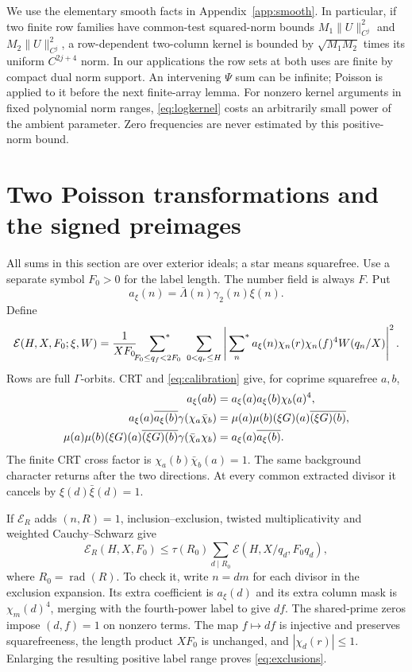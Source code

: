 \documentclass[11pt,a4paper]{article}
\numberwithin{equation}{section}
\theoremstyle{definition}
\theoremstyle{remark}
\newcommand{\rad}{\operatorname{rad}}
\newcommand{\sfstar}{\sideset{}{^*}\sum}
\newcommand{\E}{\mathcal E}
\begin{document}
We use the elementary smooth facts in Appendix~\ref{app:smooth}. In particular, if two finite row families have common-test squared-norm bounds $M_1\|U\|_{C^j}^2$ and $M_2\|U\|_{C^j}^2$, a row-dependent two-column kernel is bounded by $\sqrt{M_1M_2}$ times its uniform $C^{2j+4}$ norm. In our applications the row sets at both uses are finite by compact dual norm support. An intervening $\Psi$ sum can be infinite; Poisson is applied to it before the next finite-array lemma. For nonzero kernel arguments in fixed polynomial norm ranges, \eqref{eq:logkernel} costs an arbitrarily small power of the ambient parameter. Zero frequencies are never estimated by this positive-norm bound.

\section{Two Poisson transformations and the signed preimages}\label{sec:transfer}
All sums in this section are over exterior ideals; a star means squarefree. Use a separate symbol $F_0>0$ for the label length. The number field is always $F$. Put
\[
 a_\xi(n)=\bar\Lambda(n)\gamma_2(n)\xi(n).
 \]
 Define
 \[
 \E(H,X,F_0;\xi,W)=\frac1{XF_0}
  \sfstar_{F_0\le q_f<2F_0}\ \sum_{0<q_r\le H}
 \left|\sfstar_n a_\xi(n)\chi_n(r)\chi_n(f)^4W(q_n/X)\right|^2.
\]
Rows are full $\Gamma$-orbits. CRT and \eqref{eq:calibration} give, for coprime squarefree $a,b$,
\begin{align}\label{eq:pairGauss}
 a_\xi(ab)&=a_\xi(a)a_\xi(b)\chi_b(a)^4,\notag\\
 a_\xi(a)\overline{a_\xi(b)}\gamma(\chi_a\bar\chi_b)
   &=\mu(a)\mu(b)(\xi G)(a)\overline{(\xi G)(b)},\\
 \mu(a)\mu(b)(\xi G)(a)\overline{(\xi G)(b)}
             \gamma(\bar\chi_a\chi_b)
   &=a_\xi(a)\overline{a_\xi(b)}.\notag
\end{align}
The finite CRT cross factor is $\chi_a(b)\bar\chi_b(a)=1$. The same background character returns after the two directions. At every common extracted divisor it cancels by $\xi(d)\bar\xi(d)=1$.

If $\E_R$ adds $(n,R)=1$, inclusion--exclusion, twisted multiplicativity and weighted Cauchy--Schwarz give
\begin{equation}\label{eq:exclusions}
 \E_R(H,X,F_0)\le\tau(R_0)\sum_{d\mid R_0}
                     \E(H,X/q_d,F_0q_d),
\end{equation}
where $R_0=\rad(R)$. To check it, write $n=dm$ for each divisor in the exclusion expansion. Its extra coefficient is $a_\xi(d)$ and its extra column mask is $\chi_m(d)^4$, merging with the fourth-power label to give $df$. The shared-prime zeros impose $(d,f)=1$ on nonzero terms. The map $f\mapsto df$ is injective and preserves squarefreeness, the length product $XF_0$ is unchanged, and $|\chi_d(r)|\le1$. Enlarging the resulting positive label range proves \eqref{eq:exclusions}.
\end{document}
